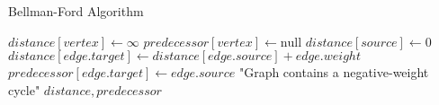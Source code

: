 \begin{algorithm}[h]
    \caption{Bellman-Ford Algorithm}
    \label{alg:bellmanford}
    \begin{algorithmic}[1]
            \State $distance[vertex] \gets \infty$
            \State $predecessor[vertex] \gets \text{null}$
        \EndFor
        \State $distance[source] \gets 0$
                    \State $distance[edge.target] \gets distance[edge.source] + edge.weight$
                    \State $predecessor[edge.target] \gets edge.source$
                \EndIf
            \EndFor
        \EndFor
                \State \Return "Graph contains a negative-weight cycle"
            \EndIf
        \EndFor
        \State \Return $distance, predecessor$
    \EndProcedure
    \end{algorithmic}
\end{algorithm}